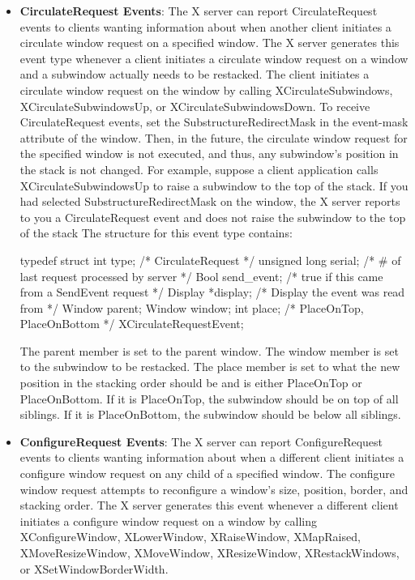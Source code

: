 \documentclass{report}
\begin{document}
\begin{itemize}
\begin{itemize}
            \end{itemize}
        \item \textbf{CirculateRequest Events}: The X server can report CirculateRequest events to clients wanting information about when another client initiates a circulate window request on a specified window. The X server generates this event type whenever a client initiates a circulate window request on a window and a subwindow actually needs to be restacked. The client initiates a circulate window request on the window by calling XCirculateSubwindows, XCirculateSubwindowsUp, or XCirculateSubwindowsDown.
            \bigbreak \noindent 
            To receive CirculateRequest events, set the SubstructureRedirectMask in the event-mask attribute of the window. Then, in the future, the circulate window request for the specified window is not executed, and thus, any subwindow’s position in the stack is not changed. For example, suppose a client application calls XCirculateSubwindowsUp to raise a subwindow to the top of the stack. If you had selected SubstructureRedirectMask on the window, the X server reports to you a CirculateRequest event and does not raise the subwindow to the top of the stack
            \bigbreak \noindent 
            The structure for this event type contains:
            \bigbreak \noindent 
            \begin{cppcode}
                typedef struct {
                    int type;                   /* CirculateRequest */
                    unsigned long serial;       /* # of last request processed by server */
                    Bool send_event;            /* true if this came from a SendEvent request */
                    Display *display;           /* Display the event was read from */
                    Window parent;
                    Window window;
                    int place;                  /* PlaceOnTop, PlaceOnBottom */
                } XCirculateRequestEvent;
            \end{cppcode}
            \bigbreak \noindent 
            The parent member is set to the parent window. The window member is set to the subwindow to be restacked. The place member is set to what the new position in the stacking order should be and is either PlaceOnTop or PlaceOnBottom. If it is PlaceOnTop, the subwindow should be on top of all siblings. If it is PlaceOnBottom, the subwindow should be below all siblings.
        \item \textbf{ConfigureRequest Events}: The X server can report ConfigureRequest events to clients wanting information about when a different client initiates a configure window request on any child of a specified window. The configure window request attempts to reconfigure a window’s size, position, border, and stacking order. The X server generates this event whenever a different client initiates a configure window request on a window by calling XConfigureWindow, XLowerWindow, XRaiseWindow, XMapRaised, XMoveResizeWindow, XMoveWindow, XResizeWindow, XRestackWindows, or XSetWindowBorderWidth.

\end{itemize}
\end{document}

